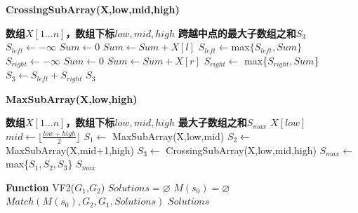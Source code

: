 \documentclass{article}
\begin{document}
\begin{CJK}{UTF8}{gbsn}
    \begin{algorithm}
            \caption{\textbf{CrossingSubArray(X,low,mid,high)}}
            \begin{algorithmic}[1]
                \Require \textbf{数组$X[1...n]$，数组下标$low,mid,high$}
                \Ensure \textbf{跨越中点的最大子数组之和$S_3$}
                \State $S_{left} \leftarrow -\infty$
                \State $Sum \leftarrow 0$
                    \State $Sum \leftarrow Sum+X[l]$
                    \State $S_{left} \leftarrow $max$\{S_{left},Sum\}$
                \EndFor
                \State $S_{right} \leftarrow -\infty$
                \State $Sum \leftarrow 0$
                    \State $Sum \leftarrow Sum+X[r]$
                    \State $S_{right} \leftarrow$ max\{$S_{right},Sum$\}
                \EndFor
                \State $S_3 \leftarrow S_{left}+S_{right}$
                \State \Return $S_3$
        \end{algorithmic}
    \end{algorithm}

    \begin{algorithm}
            \caption{\textbf{MaxSubArray(X,low,high)}}
            \begin{algorithmic}[1]
                \Require \textbf{数组$X[1...n]$，数组下标$low,mid,high$}
                \Ensure \textbf{最大子数组之和$S_{max}$}
                    \State \Return $X[low]$
                \Else
                    \State $mid \leftarrow \lfloor \frac{low+high}{2} \rfloor$
                    \State $S_1 \leftarrow $ MaxSubArray(X,low,mid)
                    \State $S_2 \leftarrow $ MaxSubArray(X,mid+1,high)
                    \State $S_3 \leftarrow $ CrossingSubArray(X,low,mid,high)
                    \State $S_{max} \leftarrow $ max\{$S_1,S_2,S_3$\}
                    \State \Return $S_{max}$
                \EndIf
        \end{algorithmic}
    \end{algorithm}

    \begin{algorithm}
            \begin{algorithmic}[1]
            \State \textbf{Function}  VF2($G_1$,$G_2$)
                \State $Solutions=\varnothing$
                \State $M(s_0)=\varnothing$
                \State $Match(M(s_0),G_2,G_1,Solutions)$
                \State \Return $Solutions$
        \end{algorithmic}
    \end{algorithm}


\end{CJK}
\end{document}
